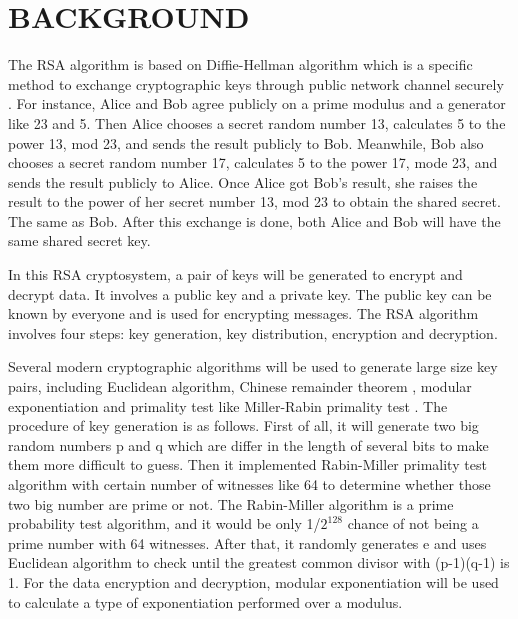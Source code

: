 \documentclass[12pt, oneside]{book}
\begin{document}
\chapter{\textbf{BACKGROUND}}
The RSA algorithm is based on Diffie-Hellman algorithm \cite{diffie1976new} which is a specific method to exchange cryptographic keys through public network channel securely \cite{nentawe2013data}. For instance, Alice and Bob agree publicly on a prime modulus and a generator like 23 and 5. Then Alice chooses a secret random number 13, calculates 5 to the power 13, mod 23, and sends the result publicly to Bob. Meanwhile, Bob also chooses a secret random number 17, calculates 5 to the power 17, mode 23, and sends the result publicly to Alice. Once Alice got Bob’s result, she raises the result to the power of her secret number 13, mod 23 to obtain the shared secret. The same as Bob. After this exchange is done, both Alice and Bob will have the same shared secret key.\par 
In this RSA cryptosystem, a pair of keys will be generated to encrypt and decrypt data. It involves a public key and a private key. The public key can be known by everyone and is used for encrypting messages. The RSA algorithm involves four steps: key generation, key distribution, encryption and decryption.\par
Several modern cryptographic algorithms will be used to generate large size key pairs, including Euclidean algorithm, Chinese remainder theorem \cite{shinde2008faster}, modular exponentiation and primality test like Miller-Rabin primality test \cite{lenstra1976miller}. The procedure of key generation is as follows. First of all, it will generate two big random numbers p and q which are differ in the length of several bits to make them more difficult to guess. Then it implemented Rabin-Miller primality test algorithm with certain number of witnesses like 64 to determine whether those two big number are prime or not. The Rabin-Miller algorithm is a prime probability test algorithm, and it would be only 1/\(2^{128}\) chance of not being a prime number with 64 witnesses. After that, it randomly generates e and uses Euclidean algorithm to check until the greatest common divisor with (p-1)(q-1) is 1. For the data encryption and decryption, modular exponentiation will be used to calculate a type of exponentiation performed over a modulus. 
\end{document}
